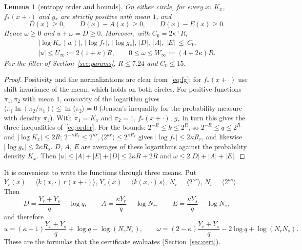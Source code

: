 \documentclass[11pt]{article}
\newtheorem{lemma}{Lemma}[section]
\theoremstyle{definition}
\newcommand{\abs}[1]{\lvert #1\rvert}
\newcommand{\av}[1]{\langle #1\rangle}
\begin{document}
\begin{lemma}[entropy order and bounds]\label{lem:order}
On either circle, for every $x$: $K_x$, $f_\ast(x+\cdot)$ and $g_\ast$ are strictly positive with mean $1$, and
\begin{equation}\label{eq:order}
 D(x)\ge0,\qquad D(x)-A(x)\ge0,\qquad D(x)-E(x)\ge0 .
\end{equation}
Hence $\omega\ge0$ and $u+\omega=D\ge0$. Moreover, with $C_0=2\kappa^+R$,
\begin{equation}\label{eq:C0}
\begin{gathered}
 \abs{\log K_x(w)},\ \abs{\log f_\ast},\ \abs{\log g_\ast},\ \abs D,\ \abs A,\ \abs E\ \le\ C_0,\\
 \abs u\le U_\infty:=2(1+\kappa)R,\qquad 0\le\omega\le W_\infty:=(4+2\kappa)R .
\end{gathered}
\end{equation}
For the filter of Section~\ref{sec:params}, $R\le7.24$ and $C_0\le15$.
\end{lemma}
\begin{proof}
Positivity and the normalizations are clear from~\eqref{eq:fg}; for $f_\ast(x+\cdot)$ use shift invariance of the
mean, which holds on both circles. For positive functions $\pi_1,\pi_2$ with mean $1$, concavity of the logarithm
gives $\av{\pi_1\ln(\pi_2/\pi_1)}\le\ln\av{\pi_2}=0$ (Jensen's inequality for the probability measure with density
$\pi_1$). With $\pi_1=K_x$ and $\pi_2=1$, $f_\ast(x+\cdot)$, $g_\ast$ in turn this gives the three inequalities
of~\eqref{eq:order}. For the bounds: $2^{-R}\le k\le2^{R}$, so $2^{-R}\le q\le2^R$ and $\abs{\log K_x}\le2R$;
$2^{-\kappa R_r}\le2^{\kappa r},\av{2^{\kappa r}}\le2^{\kappa R_r}$ gives $\abs{\log f_\ast}\le2\kappa R_r$, and likewise
$\abs{\log g_\ast}\le2\kappa R_s$. $D$, $A$, $E$ are averages of these logarithms against the probability density
$K_x$. Then $\abs u\le\abs A+\abs E+\abs D\le2\kappa R+2R$ and $\omega\le2\abs D+\abs A+\abs E$.
\end{proof}

It is convenient to write the functions through three means. Put
$Y_r(x)=\av{k(x,\cdot)\,r(x+\cdot)}$, $Y_s(x)=\av{k(x,\cdot)\,s}$, $N_r=\av{2^{\kappa r}}$, $N_s=\av{2^{\kappa s}}$. Then
\begin{equation}\label{eq:means}
 D=\frac{Y_r+Y_s}{q}-\log q,\qquad A=\frac{\kappa Y_r}{q}-\log N_r,\qquad E=\frac{\kappa Y_s}{q}-\log N_s ,
\end{equation}
and therefore
\begin{equation}\label{eq:uomega}
 u=(\kappa-1)\frac{Y_r+Y_s}{q}+\log q-\log(N_rN_s),\qquad
 \omega=(2-\kappa)\frac{Y_r+Y_s}{q}-2\log q+\log(N_rN_s).
\end{equation}
These are the formulas that the certificate evaluates (Section~\ref{sec:cert}).
\end{document}
